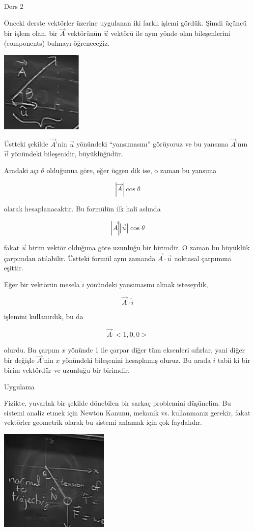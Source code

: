 \documentclass[12pt,fleqn]{article}\usepackage{../../common}
\begin{document}
Ders 2


Önceki derste vektörler üzerine uygulanan iki farklı işlemi gördük. Şimdi üçüncü
bir işlem olan, bir $\vec{A}$ vektörünün $\vec{u}$ vektörü ile aynı yönde olan
bileşenlerini (components) bulmayı öğreneceğiz.

\begin{center}
\includegraphics[height=4cm]{2_1.png}
\end{center}

Üstteki şekilde $\vec{A}$'nin $\vec{u}$ yönündeki ``yansımasını'' görüyoruz ve
bu yansıma $\vec{A}$'nın $\vec{u}$ yönündeki bileşenidir, büyüklüğüdür.

Aradaki açı $\theta$ olduğunua göre, eğer üçgen dik ise, o zaman bu yansıma 

$$ |\vec{A}| \cos \theta $$

olarak hesaplanacaktır. Bu formülün ilk hali aslında

$$ |\vec{A}| |\vec{u}| \cos \theta $$

fakat $\vec{u}$ birim vektör olduğuna göre uzunluğu bir birimdir. O zaman bu
büyüklük çarpımdan atılabilir.  Üstteki formül aynı zamanda
$\vec{A}\cdot\vec{u}$ noktasal çarpımına eşittir.

Eğer bir vektörün mesela $\hat{i}$ yönündeki yansımasını almak isteseydik,

$$ \vec{A} \cdot \hat{i} $$

işlemini kullanırdık, bu da

$$ \vec{A} \cdot <1,0,0>$$

olurdu. Bu çarpım $x$ yönünde 1 ile çarpar diğer tüm eksenleri sıfırlar, yani
diğer bir değişle $\vec{A}$'nin $x$ yönündeki bileşenini hesaplamış oluruz. Bu
arada $\hat{i}$ tabii ki bir birim vektördür ve uzunluğu bir birimdir.


Uygulama

Fizikte, yuvarlak bir şekilde dönebilen bir sarkaç problemini düşünelim. Bu
sistemi analiz etmek için Newton Kanunu, mekanik vs. kullanmanız gerekir, fakat 
vektörler geometrik olarak bu sistemi anlamak için çok faydalıdır.

\begin{center}
\includegraphics[height=5cm]{2_2.png}
\end{center}
\end{document}
